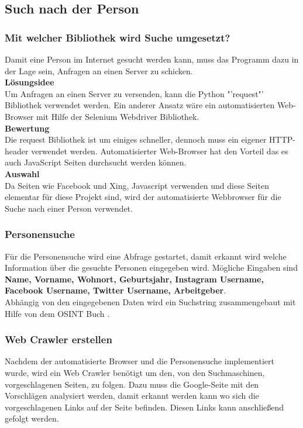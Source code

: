  	\subsection{Such nach der Person}
 		\subsubsection{Mit welcher Bibliothek wird Suche umgesetzt?}
	 	Damit eine Person im Internet gesucht werden kann, muss das Programm dazu in der Lage sein, Anfragen an einen Server zu schicken. \\
	 	\textbf{Lösungsidee}\\
	 	Um Anfragen an einen Server zu versenden, kann die Python "'request"' Bibliothek verwendet werden. Ein anderer Ansatz wäre ein automatisierten Web-Browser mit Hilfe der Selenium Webdriver Bibliothek.\\
	 	\textbf{Bewertung}\\
	 	Die request Bibliothek ist um einiges schneller, dennoch muss ein eigener HTTP-header verwendet werden. Automatisierter Web-Browser hat den Vorteil das es auch JavaScript Seiten durchsucht werden können.\\
	 	\textbf{Auswahl}\\
	 	Da Seiten wie Facebook und Xing, Javascript verwenden und diese Seiten elementar für diese Projekt sind, wird der automatisierte Webbrowser für die Suche nach einer Person verwendet.
	 	\subsubsection{Personensuche}
	 	Für die Personensuche wird eine Abfrage gestartet, damit erkannt wird welche Information über die gesuchte Personen eingegeben wird. Mögliche Eingaben sind \textbf{Name, Vorname, Wohnort, Geburtsjahr, Instagram Username, Facebook Username, Twitter Username, Arbeitgeber}.\\
	 	Abhängig von den eingegebenen Daten wird ein Suchstring zusammengebaut mit Hilfe von dem OSINT Buch \cite{Bazzell}. %
 		\subsubsection{Web Crawler erstellen}
 		Nachdem der automatisierte Browser und die Personensuche implementiert wurde, wird ein Web Crawler benötigt um den, von den Suchmaschinen, vorgeschlagenen Seiten, zu folgen. Dazu muss die Google-Seite mit den Vorschlägen analysiert werden, damit erkannt werden kann wo sich die vorgeschlagenen Links auf der Seite befinden. Diesen Links kann anschließend gefolgt werden.
